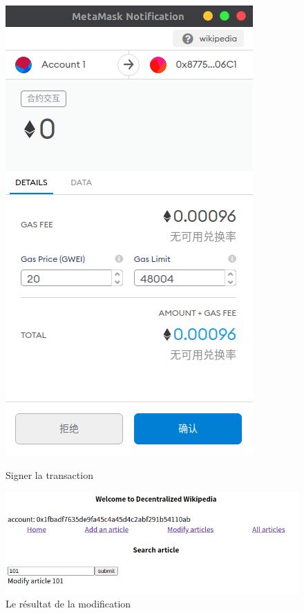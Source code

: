 \documentclass[14px]{article}
\begin{document}
\begin{figure}[H]
\begin{minipage}[H]{0.3\linewidth}
			\includegraphics[width=\textwidth]{Modify02.png}
			\caption{Signer la transaction}
			\label{img2}
		\end{minipage}
		\begin{minipage}[H]{0.7\linewidth}
			\centering
			\includegraphics[width=\textwidth]{Modify03.png}
			\caption{Le résultat de la modification}
			\label{img2}
		\end{minipage}
	\end{figure}
\end{document}
